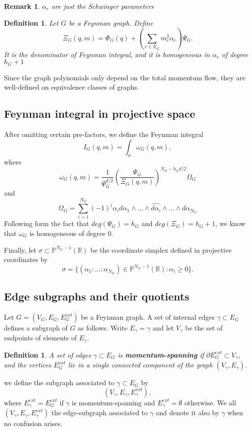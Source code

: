 \documentclass[11pt]{article}
\newtheorem{dfn}[thm]{Definition}
\newtheorem{rmk}[thm]{Remark}
\newcommand{\reals}{\mathbb R}
\newcommand{\bbp}{\mathbb P}
\begin{document}
\begin{rmk}
$\alpha_e$ are just the Schwinger parameters
\end{rmk}

\begin{dfn}
Let $G$ be a Feynman graph. Define
$$
\Xi_G(q,m)=\Phi_G(q)+\left(\sum_{e\in E_G}m_e^2\alpha_e\right)\Psi_G.
$$
It is the denominator of Feynman integral, and it is homogeneous in $\alpha_e$ of degree $h_G+1$
\end{dfn}
Since the graph polynomials only depend on the total momentum flow, they are well-defined on equivalence classes of graphs.
\subsection{Feynman integral in projective space}
After omitting certain pre-factors, we define the Feynman integral
$$
I_G(q,m)=\int_\sigma \omega_G(q,m),
$$
where
$$
\omega_G(q,m)=\frac{1}{\Psi_G^{d/2}}\left(\frac{\Psi_G}{\Xi_G(q,m)}\right)^{N_G-h_Gd/2}\Omega_G
$$
and
$$
\Omega_G=\sum^{N_G}_{i=1}(-1)^i\alpha_i d\alpha_1\wedge...\wedge \widehat{d\alpha_i}\wedge...\wedge d\alpha_{N_G}
$$
Following form the fact that $deg(\Psi_G)=h_G$ and $deg(\Xi_G)=h_G+1$, we know that $\omega_G$ is homogeneous of degree $0$.

Finally, let $\sigma\subset \bbp^{N_G-1}(\reals)$ be the coordinate simplex defined in projective coordinates by
$$
\sigma=\{(\alpha_1:...:\alpha_{N_G})\in \bbp^{N_G-1}(\reals):\alpha_i\geq0\}.
$$
\subsection{Edge subgraphs and their quotients}

Let $G=(V_G,E_G,E_G^{ext})$ be a Feynman graph. A set of internal edges $\gamma\subset E_G$ defines a subgraph of $G$ as follows. Write $E_\gamma=\gamma$ and let $V_\gamma$ be the set of endpoints of elements of $E_\gamma$.
\begin{dfn}
A set of edges $\gamma\subset E_G$ is \textbf{momentum-spanning} if $\partial E^{ext}_G\subset V_\gamma$, and the vertices $E^{ext}_G$ lie in a single connected component of the graph $(V_\gamma, E_\gamma)$.
\end{dfn}

we define the subgraph associated to $\gamma\subset E_G$ by
$$
(V_\gamma, E_\gamma, E^{ext}_\gamma),
$$
where $E^{ext}_\gamma=E^{ext}_G$ if $\gamma$ is momentum-spanning and $E_\gamma^{ext}=\emptyset$ otherwise. We all $(V_\gamma, E_\gamma, E^{ext}_\gamma)$ the edge-subgraph associated to $\gamma$ and denote it also by $\gamma$ when no confusion arises.
\end{document}
